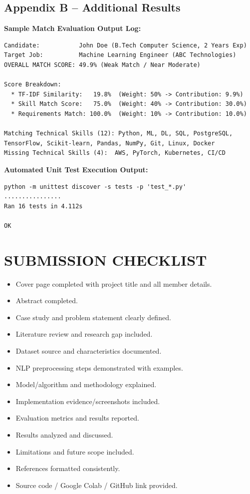 \documentclass[11pt,a4paper]{article}
\begin{document}
\subsection*{Appendix B -- Additional Results}
\textbf{Sample Match Evaluation Output Log:}
\begin{lstlisting}
Candidate:           John Doe (B.Tech Computer Science, 2 Years Exp)
Target Job:          Machine Learning Engineer (ABC Technologies)
OVERALL MATCH SCORE: 49.9% (Weak Match / Near Moderate)

Score Breakdown:
  * TF-IDF Similarity:   19.8%  (Weight: 50% -> Contribution: 9.9%)
  * Skill Match Score:   75.0%  (Weight: 40% -> Contribution: 30.0%)
  * Requirements Match: 100.0%  (Weight: 10% -> Contribution: 10.0%)

Matching Technical Skills (12): Python, ML, DL, SQL, PostgreSQL, TensorFlow, Scikit-learn, Pandas, NumPy, Git, Linux, Docker
Missing Technical Skills (4):  AWS, PyTorch, Kubernetes, CI/CD
\end{lstlisting}

\vspace{0.3cm}
\textbf{Automated Unit Test Execution Output:}
\begin{lstlisting}
python -m unittest discover -s tests -p 'test_*.py'
................
Ran 16 tests in 4.112s

OK
\end{lstlisting}

\newpage

\section*{SUBMISSION CHECKLIST}

\begin{itemize}[label={\textcolor{checkgreen}{\CheckedBox}}, leftmargin=2em, itemsep=0.4cm]
    \item Cover page completed with project title and all member details.
    \item Abstract completed.
    \item Case study and problem statement clearly defined.
    \item Literature review and research gap included.
    \item Dataset source and characteristics documented.
    \item NLP preprocessing steps demonstrated with examples.
    \item Model/algorithm and methodology explained.
    \item Implementation evidence/screenshots included.
    \item Evaluation metrics and results reported.
    \item Results analyzed and discussed.
    \item Limitations and future scope included.
    \item References formatted consistently.
    \item Source code / Google Colab / GitHub link provided.
\end{itemize}
\end{document}
